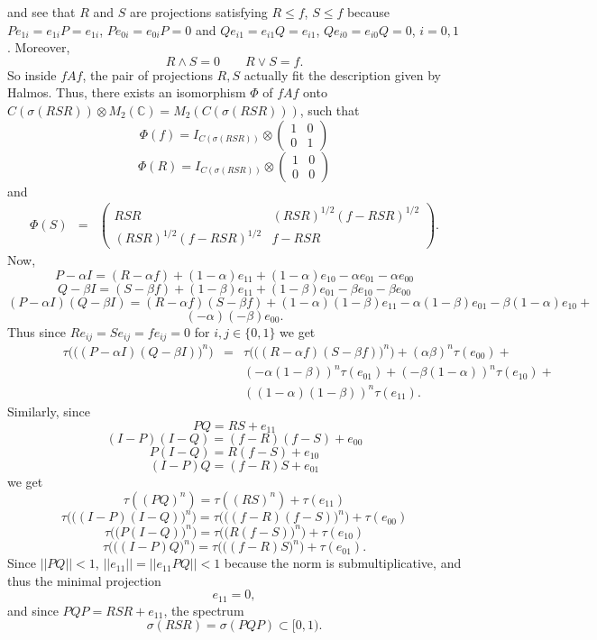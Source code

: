 \documentclass{amsart}
\newcommand{\C}{\mathbb C}
\theoremstyle{definition}
\begin{document}
and see that $R$ and $S$ are projections satisfying $R\le f$, $S\le f$ because $Pe_{1i}=e_{1i}P=e_{1i}$, $Pe_{0i}=e_{0i}P=0$ and $Qe_{i1}=e_{i1}Q=e_{i1}$, $Qe_{i0}=e_{i0}Q=0$, $i=0,1$. Moreover,
$$R\land S=0\qquad R\lor S=f.$$
So inside $fAf$, the pair of projections $R,S$ actually fit the description given by Halmos.
Thus, there exists an isomorphism $\Phi$ of $f Af$ onto
$C(\sigma(RSR))\otimes M_2(\C)=M_2(C(\sigma(RSR)))$, such that
$$\Phi(f)=I_{C(\sigma(RSR))}\otimes \left(\begin{array}{cc}
  1  & 0   \\
  0 &  1   
\end{array}
\right)$$
$$\Phi(R)=I_{C(\sigma(RSR))}\otimes \left(\begin{array}{cc}
  1  & 0   \\
  0 &  0   
\end{array}
\right)$$
and
\begin{eqnarray*}
\Phi(S)&=&\left(\begin{array}{cc}
  RSR  & (RSR)^{1/2}(f-RSR)^{1/2}   \\
  (RSR)^{1/2}(f-RSR)^{1/2} &  f-RSR   
\end{array}
\right).
\end{eqnarray*}
Now, 
$$P-\alpha I= (R-\alpha f)+(1-\alpha)e_{11}+(1-\alpha)e_{10}-\alpha e_{01}-\alpha e_{00}$$
$$Q-\beta I= (S-\beta f)+(1-\beta)e_{11}+(1-\beta)e_{01}-\beta e_{10}-\beta e_{00}$$
$$(P-\alpha I)(Q-\beta I)=(R-\alpha f)(S-\beta f) + (1-\alpha)(1-\beta) e_{11}-\alpha(1-\beta)e_{01}-\beta(1-\alpha)e_{10}+$$
$$(-\alpha)(-\beta) e_{00}.$$
Thus since $R e_{ij}=S e_{ij}=f e_{ij}=0$ for $i,j\in\{0,1\}$ we get
\begin{eqnarray}\label{e:tauEFn}
\qquad\qquad\tau\Big(\big((P-\alpha I)(Q-\beta I)\big)^n\Big)&=&\tau\Big(\big((R-\alpha f)(S-\beta f)\big)^n\Big)+(\alpha\beta)^n\tau(e_{00})+\\
\nonumber&&(-\alpha (1-\beta))^n \tau(e_{01})+(-\beta(1-\alpha ))^n \tau(e_{10})+\\
\nonumber&&((1-\alpha )(1-\beta))^n \tau(e_{11}).
\end{eqnarray}
Similarly, since
$$PQ=RS+e_{11}$$
$$(I-P)(I-Q)=(f-R)(f-S)+e_{00}$$
$$P(I-Q)=R(f-S)+e_{10}$$
$$(I-P)Q=(f-R)S+e_{01}$$
we get
$$\tau((PQ)^n)=\tau((RS)^n)+\tau(e_{11})$$
$$\tau\Big(\big((I-P)(I-Q)\big)^n\Big)=\tau\Big(\big((f-R)(f-S)\big)^n\Big)+\tau(e_{00})$$
$$\tau\Big(\big(P(I-Q)\big)^n\Big)=\tau\Big(\big(R(f-S)\big)^n\Big)+\tau(e_{10})$$
$$\tau\Big(\big((I-P)Q\big)^n\Big)=\tau\Big(\big((f-R)S\big)^n\Big)+\tau(e_{01}).$$
Since $||PQ||<1$, $||e_{11}||=||e_{11}PQ||<1$ because the norm is submultiplicative, and thus the minimal projection $$e_{11}=0,$$ and since $PQP=RSR+e_{11}$, the spectrum $$\sigma(RSR)=\sigma(PQP)\subset [0,1).$$
\end{document}
